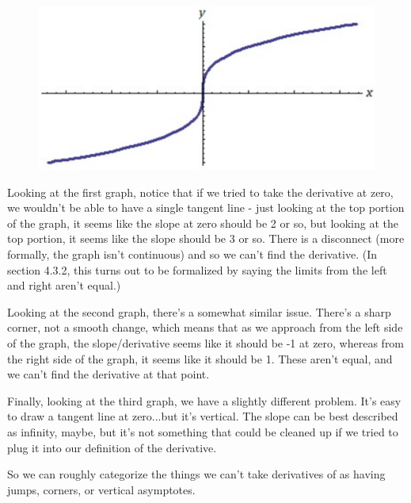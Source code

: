 \begin{figure}[H]
    \includegraphics[scale=.2]{steep.png}
    \label{fig:my_label}
\end{figure}

Looking at the first graph, notice that if we tried to take the derivative at zero, we wouldn't be able to have a single tangent line - just looking at the top portion of the graph, it seems like the slope at zero should be 2 or so, but looking at the top portion, it seems like the slope should be 3 or so. There is a disconnect (more formally, the graph isn't continuous) and so we can't find the derivative. (In section 4.3.2, this turns out to be formalized by saying the limits from the left and right aren't equal.)

Looking at the second graph, there's a somewhat similar issue. There's a sharp corner, not a smooth change, which means that as we approach from the left side of the graph, the slope/derivative seems like it should be -1 at zero, whereas from the right side of the graph, it seems like it should be 1. These aren't equal, and we can't find the derivative at that point.

Finally, looking at the third graph, we have a slightly different problem. It's easy to draw a tangent line at zero...but it's vertical. The slope can be best described as infinity, maybe, but it's not something that could be cleaned up if we tried to plug it into our definition of the derivative.

So we can roughly categorize the things we can't take derivatives of as having jumps, corners, or vertical asymptotes.